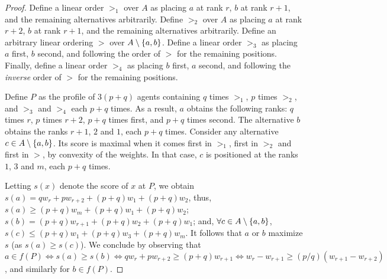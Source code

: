 \documentclass[runningheads]{llncs}
\theoremstyle{remark}
\begin{document}
\begin{proof}[Proof]
	\label{proof:chairQuestions}
	Define a linear order $>_1$ over $A$ as placing $a$ at rank $r$, $b$ at rank $r + 1$, and the remaining alternatives arbitrarily. 
	Define %
	$>_2$ over $A$ as placing $a$ at rank $r + 2$, $b$ at rank $r + 1$, and the remaining alternatives arbitrarily.
	Define an arbitrary linear ordering $>$ over $A \setminus \{a, b\}$. 
	Define a linear order $>_3$ as placing $a$ first, $b$ second, and following the order of $>$ for the remaining positions.
	Finally, define a linear order $>_4$ as placing $b$ first, $a$ second, and following the \emph{inverse} order of $>$ for the remaining positions.
	
	Define $P$ as the profile of $3 (p + q)$ agents containing $q$ times $>_1$, $p$ times $>_2$, and $>_3$ and $>_4$ each $p + q$ times.
	As a result, $a$ obtains the following ranks: $q$ times $r$, $p$ times $r + 2$, $p + q$ times first, and $p + q$ times second. The alternative $b$ obtains the ranks $r + 1$, $2$ and $1$, each $p + q$ times. Consider any alternative $c \in A \setminus \{a, b\}$. Its score is maximal when it comes first in $>_1$, first in $>_2$ and first in $>$, by convexity of the weights. In that case, $c$ is positioned at the ranks $1$, $3$ and $m$, each $p + q$ times. 
	
	Letting $s(x)$ denote the score of $x$ at $P$, we obtain $s(a) = q w_r + p w_{r + 2} + (p + q) w_1 + (p + q) w_2$, thus, $s(a) ≥ (p + q) w_m + (p + q) w_1 + (p + q) w_2$; $s(b) = (p + q) w_{r + 1} + (p + q) w_2 + (p + q) w_1$; and, $\forall c \in A \setminus \{a, b\}$, 
	$s(c) ≤ (p + q) w_1 + (p + q) w_3 + (p + q) w_m$. It follows that $a$ or $b$ maximize $s$ (as $s(a) ≥ s(c)$). We conclude by observing that $a \in f(P) ⇔ s(a) ≥ s(b) ⇔ q w_r + p w_{r + 2} ≥ (p + q) w_{r + 1} ⇔ w_r - w_{r + 1} ≥ (p / q) (w_{r + 1} - w_{r + 2})$, and similarly for $b \in f(P)$.
\end{proof}
\end{document}
